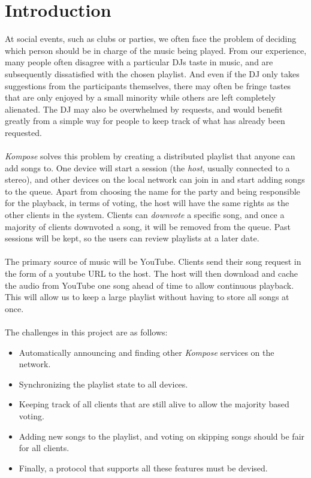 \documentclass{report}
\begin{document}
\section{Introduction}
At social events, such as clubs or parties, we often face the problem of deciding which person should be
in charge of the music being played. From our experience, many people often disagree with a particular 
DJs taste in music, and are subsequently dissatisfied with the chosen playlist. And even if the DJ only takes
suggestions from the participants themselves, there may often be fringe tastes that are only enjoyed by a 
small minority while others are left completely alienated. The DJ may also be overwhelmed by requests, and
would benefit greatly from a simple way for people to keep track of what has already been requested.\\\\
%
\emph{Kompose} solves this problem by creating a distributed playlist that anyone
can add songs to. 
One device will start a session (the \emph{host}, usually connected
to a stereo), and other devices on the local network can join in and start
adding songs to the queue. Apart from choosing the name for the party and 
being responsible for the playback, in terms of voting, the host will have 
the same rights as the other clients in the system.
Clients can \emph{downvote} a specific song, and once a majority of clients 
downvoted a song, it will be removed from the queue.  
Past sessions will be kept, so the users can review playlists at a later date.\\\\
%
The primary source of music will be YouTube. Clients send their song request 
in the form of a youtube URL to the host. The host will then download and cache the
audio from YouTube one song ahead of time to allow continuous playback. This will allow
us to keep a large playlist without having to store all songs at once.\\\\
%
The challenges in this project are as follows: 
\begin{itemize}
	\item Automatically announcing and finding other \emph{Kompose} services on the network.
	\item Synchronizing the playlist state to all devices.
	\item Keeping track of all clients that are still alive to allow the majority based voting.
	\item Adding new songs to the playlist, and voting on skipping songs should be fair for all clients.
	\item Finally, a protocol that supports all these features must be devised.
\end{itemize}
\end{document}
